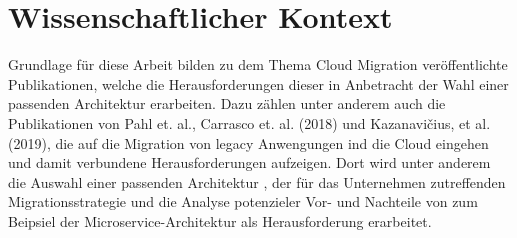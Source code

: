 \section{Wissenschaftlicher Kontext}

Grundlage für diese Arbeit bilden zu dem Thema Cloud Migration veröffentlichte Publikationen, welche die Herausforderungen
dieser in Anbetracht der Wahl einer passenden Architektur erarbeiten. Dazu zählen unter anderem auch die Publikationen
von Pahl et. al., Carrasco et. al. (2018) und Kazanavičius, et al. (2019), die auf die Migration von legacy Anwengungen
ind die Cloud eingehen und damit verbundene Herausforderungen aufzeigen. Dort wird unter anderem die Auswahl einer
passenden Architektur \cite[Vgl.][S. 14]{Pahl}, der für das Unternehmen zutreffenden Migrationsstrategie
\cite[Vgl.][S. 4]{Kazanavicius2019} und die Analyse potenzieler Vor- und Nachteile von zum Beipsiel der
Microservice-Architektur \cite[Vgl.][S. 3]{Carrasco2018} als Herausforderung erarbeitet.